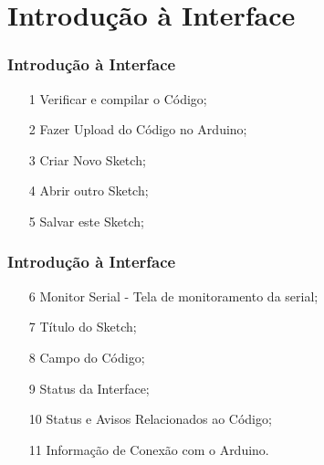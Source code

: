 \documentclass{beamer}
\begin{document}
\section{Introdução à Interface}
\begin{frame}
	\frametitle{Introdução à Interface}
	\begin{center}
	\end{center}
	\begin{itemize}
		\item[1] Verificar e compilar o Código;
		\item[2] Fazer Upload do Código no Arduino;
		\item[3] Criar Novo Sketch;
		\item[4] Abrir outro Sketch;
		\item[5] Salvar este Sketch;
	\end{itemize}
\end{frame}

\begin{frame}
	\frametitle{Introdução à Interface}
	\begin{center}
	\end{center}
	\begin{itemize}
		\item[6]  Monitor Serial - Tela de monitoramento da serial;
		\item[7]  Título do Sketch;
		\item[8]  Campo do Código;
		\item[9]  Status da Interface;
		\item[10] Status e Avisos Relacionados ao Código;
		\item[11] Informação de Conexão com o Arduino.
	\end{itemize}
\end{frame}

\end{document}
